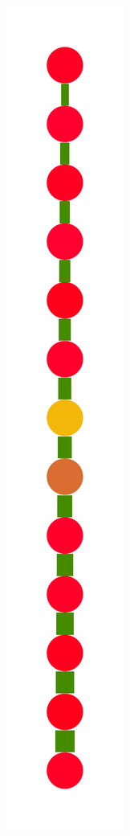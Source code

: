 \documentclass[a4paper,10pt]{article}
\begin{document}
\begin{figure}
{    \includegraphics[scale=.14]{./figures/6-3-recursion-induced-4.pdf}
}
\end{figure}
\end{document}
